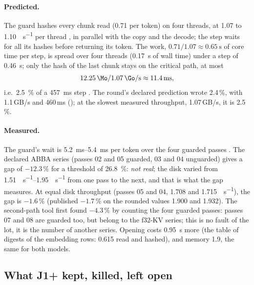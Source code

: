 \paragraph{Predicted.} The guard hashes every chunk read (\SI{0.71}{\Go} per token) on four threads, at \num{1.07} to \SI{1.10}{\Go\per\second} per thread \mes, in parallel with the copy and the decode; the step waits for all its hashes before returning its token. The work, $0.71 / 1.07 \approx \SI{0.65}{\second}$ of core time per step, is spread over four threads (\SI{0.17}{\second} of wall time) under a step of \SI{0.46}{\second}; only the hash of the last chunk stays on the critical path, at most
\[
\SI{12.25}{\Mo} / \SI{1.07}{\Go\per\second} \approx \SI{11.4}{\milli\second},
\]
i.e.\ \SI{2.5}{\percent} of a \SI{457}{\milli\second} step \calc. The round's declared prediction wrote 2.4\,\%, with 1.1\,GB/s and 460\,ms (); at the slowest measured throughput, 1.07\,GB/s, it is 2.5\,\%.

\paragraph{Measured.} The guard's wait is \SIrange{5.2}{5.4}{\milli\second} per token over the four guarded passes \mes. The declared ABBA series (passes 02 and 05 guarded, 03 and 04 unguarded) gives a gap of $-12.3\,\%$ for a threshold of \SI{26.8}{\percent}: \emph{not real}; the disk varied from \SIrange{1.51}{1.95}{\Go\per\second} from one pass to the next, and that is what the gap measures. At equal disk throughput (passes 05 and 04, \num{1.708} and \SI{1.715}{\Go\per\second}), the gap is $-1.6\,\%$ (published $-1.7\,\%$ on the rounded values \num{1.900} and \num{1.932}). The second-path tool first found $-4.3\,\%$ by counting the four guarded passes: passes 07 and 08 are guarded too, but belong to the f32-KV series; this is no fault of the lot, it is the number of another series. Opening costs \SI{0.95}{\second} more (the table of digests of the embedding rows: \SI{0.615}{\Go} read and hashed), and memory \SI{1.9}{\Mo}, the same for both models.

\subsection{What J1+ kept, killed, left open}\label{t2res-sec:j1plus}

